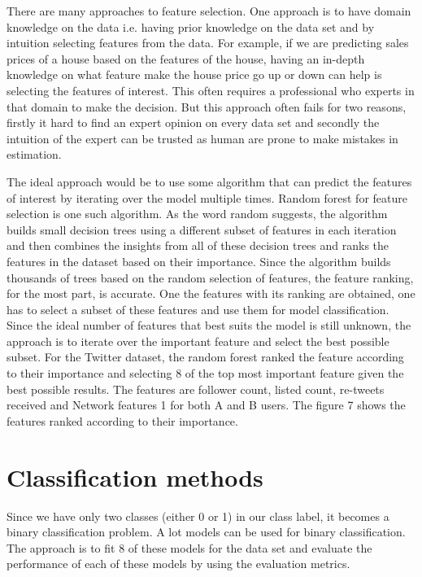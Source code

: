 \documentclass[sigconf]{acmart}
\begin{document}
There are many approaches to feature selection. One approach is to have domain knowledge on the data i.e. having prior knowledge on the data set and by intuition selecting features from the data. For example, if we are predicting sales prices of a house based on the features of the house, having an in-depth knowledge on what feature make the house price go up or down can help is selecting the features of interest. This often requires a professional who experts in that domain to make the decision. But this approach often fails for two reasons, firstly it hard to find an expert opinion on every data set and secondly the intuition of the expert can be trusted as human are prone to make mistakes in estimation.

The ideal approach would be to use some algorithm that can predict the features of interest by iterating over the model multiple times. Random forest for feature selection is one such algorithm. As the word random suggests, the algorithm builds small decision trees using a different subset of features in each iteration and then combines the insights from all of these decision trees and ranks the features in the dataset based on their importance. Since the algorithm builds thousands of trees based on the random selection of features, the feature ranking, for the most part, is accurate. One the features with its ranking are obtained, one has to select a subset of these features and use them for model classification. Since the ideal number of features that best suits the model is still unknown, the approach is to iterate over the important feature and select the best possible subset. For the Twitter dataset, the random forest ranked the feature according to their importance and selecting 8 of the top most important feature given the best possible results.
The features are follower count, listed count, re-tweets received and Network features 1 for both A and B users. The figure 7 shows the features ranked according to their importance.


\section{Classification methods}
Since we have only two classes (either 0 or 1) in our class label, it becomes a binary classification problem. A lot models can be used for binary classification. The approach is to fit 8 of these models for the data set and evaluate the performance of each of these models by using the evaluation metrics.
\end{document}
